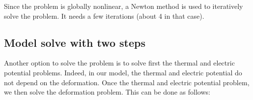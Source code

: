 \documentclass[a4paper,11pt,english]{sphinxmanual}
\begin{document}
Since the problem is globally nonlinear, a Newton method is used to iteratively solve the problem. It needs a few iterations (about 4 in that case).


\subsection{Model solve with two steps}
\label{\detokenize{tutorial/thermo_coupling:model-solve-with-two-steps}}
Another option to solve the problem is to solve first the thermal and electric potential problems. Indeed, in our model, the thermal and  electric potential do not depend on the deformation. Once the  thermal and electric potential problem, we then solve the deformation problem. This can be done as follows:


\begin{savenotes}\sphinxattablestart
\centering
\begin{tabular}[t]{|p{0.080\linewidth}|p{0.900\linewidth}|}
\hline


\end{tabular}
\end{savenotes}
\end{document}
